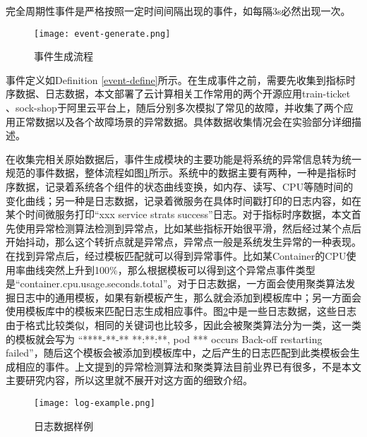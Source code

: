\begin{definition}[完全周期性事件]
    \label{periodic-event}
    完全周期性事件是严格按照一定时间间隔出现的事件，如每隔3s必然出现一次。
\end{definition}

\begin{figure}[htbp]
    \centering
    \texttt{[image: event-generate.png]}
    \caption{事件生成流程\label{event-generate}}
\end{figure}

事件定义如Definition \ref{event-define}所示。在生成事件之前，需要先收集到指标时序数据、日志数据，本文部署了云计算相关工作常用的两个开源应用train-ticket\cite{zhou2018poster} 、sock-shop\cite{rahman2019predicting}于阿里云平台上，随后分别多次模拟了常见的故障，并收集了两个应用正常数据以及各个故障场景的异常数据。具体数据收集情况会在实验部分详细描述。

在收集完相关原始数据后，事件生成模块的主要功能是将系统的异常信息转为统一规范的事件数据，整体流程如图\ref{event-generate}所示。系统中的数据主要有两种，一种是指标时序数据，记录着系统各个组件的状态曲线变换，如内存、读写、CPU等随时间的变化曲线；另一种是日志数据，记录着微服务在具体时间戳打印的日志内容，如在某个时间微服务打印“xxx service strats success”日志。对于指标时序数据，本文首先使用异常检测算法检测到异常点，比如某些指标开始很平滑，然后经过某个点后开始抖动，那么这个转折点就是异常点，异常点一般是系统发生异常的一种表现。在找到异常点后，经过模板匹配就可以得到异常事件。比如某Container的CPU使用率曲线突然上升到100\%，那么根据模板可以得到这个异常点事件类型是“container.cpu.usage.seconds.total”。对于日志数据，一方面会使用聚类算法发掘日志中的通用模板，如果有新模板产生，那么就会添加到模板库中；另一方面会使用模板库中的模板来匹配日志生成相应事件。图\ref{log-example}中是一些日志数据，这些日志由于格式比较类似，相同的关键词也比较多，因此会被聚类算法分为一类，这一类的模板就会写为 “****-**-** **:**:**, pod *** occurs Back-off restarting failed”，随后这个模板会被添加到模板库中，之后产生的日志匹配到此类模板会生成相应的事件。上文提到的异常检测算法\cite{yang2019integrated}和聚类算法\cite{landauer2020system}目前业界已有很多，不是本文主要研究内容，所以这里就不展开对这方面的细致介绍。

\begin{figure}[htbp]
    \centering
    \texttt{[image: log-example.png]}
    \caption{日志数据样例\label{log-example}}
\end{figure}

